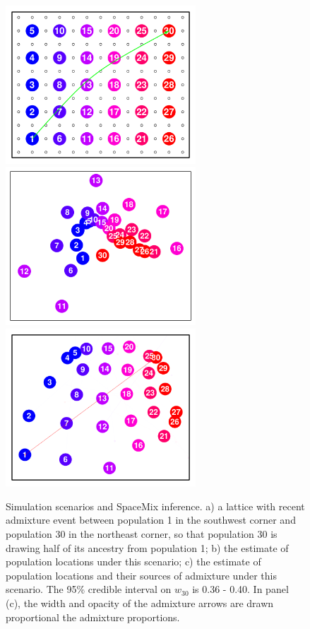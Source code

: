 \documentclass[12pt]{article}
\begin{document}
\begin{figure}
	\centering
			{\includegraphics[width=2.8in,height=2.33in]{figs/sims/corner_admixture_lattice.pdf}}
			{\includegraphics[width=2.8in,height=2.33in]{figs/sims/GeoGenMap_corner_admixture_CYOL.pdf}}
			{\includegraphics[width=2.8in,height=2.33in]{figs/sims/GeoGenMap_corner_admixture.pdf}}
	\caption{Simulation scenarios and SpaceMix inference.  a) a lattice with recent admixture event between population 1 in the southwest corner and population 30 in the northeast corner, so that population 30 is drawing half of its ancestry from population 1; b) the estimate of population locations under this scenario; c) the estimate of population locations and their sources of admixture under this scenario.  The 95\% credible interval on $w_{30}$ is 0.36 - 0.40. In panel (c), the width and opacity of the admixture arrows are drawn proportional the admixture proportions.}\label{sfig:corner_admix_scenarios}
\end{figure}
\end{document}

